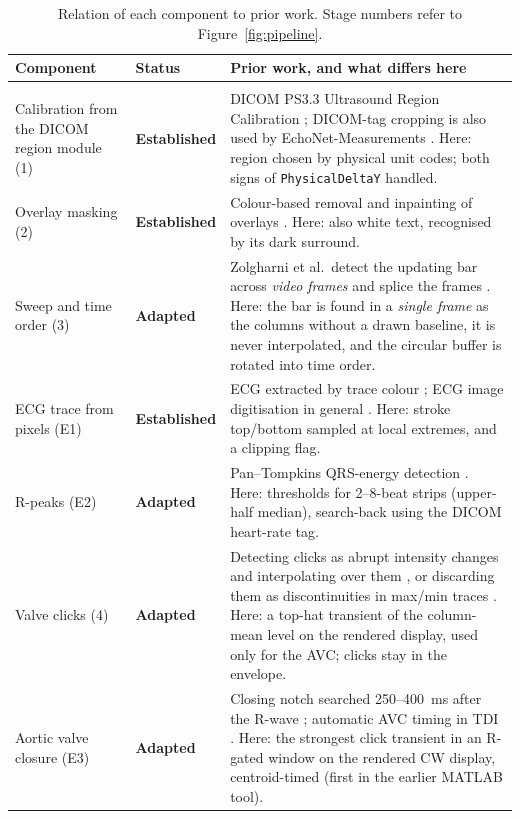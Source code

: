 \documentclass[10pt,a4paper]{article}
\newcommand{\code}[1]{\texttt{\small #1}}
\newcommand{\est}{\textcolor{gray!75!black}{\textbf{Established}}}
\newcommand{\adp}{\textcolor{orange!80!black}{\textbf{Adapted}}}
\begin{document}
\begin{table}[!htbp]
\centering\footnotesize
\caption{Relation of each component to prior work. Stage numbers refer to Figure~\ref{fig:pipeline}.}
\label{tab:novelty}
\setlength{\tabcolsep}{4pt}
\begin{tabularx}{\linewidth}{@{}>{\raggedright\arraybackslash}p{3.3cm}>{\raggedright\arraybackslash}p{1.9cm}L@{}}
\toprule
Component & Status & Prior work, and what differs here \\ \midrule
{} \\
Calibration from the DICOM region module (1) & \est & DICOM PS3.3 Ultrasound Region Calibration \cite{dicomus}; DICOM-tag cropping is also used by
EchoNet-Measurements \cite{echonetmeas}. Here: region chosen by physical unit codes; both signs of \code{PhysicalDeltaY} handled. \\
Overlay masking (2) & \est & Colour-based removal and inpainting of overlays \cite{uaguidance,zolgharni}. Here: also white text, recognised by its dark surround. \\
Sweep and time order (3) & \adp & Zolgharni et al.\ detect the updating bar across \emph{video frames} and splice the frames \cite{zolgharni}.
Here: the bar is found in a \emph{single frame} as the columns without a drawn baseline, it is never interpolated, and the circular buffer is rotated into time order. \\
ECG trace from pixels (E1) & \est & ECG extracted by trace colour \cite{zolgharni}; ECG image digitisation in general \cite{physionet2024}.
Here: stroke top/bottom sampled at local extremes, and a clipping flag. \\
R-peaks (E2) & \adp & Pan--Tompkins QRS-energy detection \cite{pantompkins}. Here: thresholds for 2--8-beat strips (upper-half median), search-back using the DICOM heart-rate tag. \\
Valve clicks (4) & \adp & Detecting clicks as abrupt intensity changes and interpolating over them \cite{patclickinterp}, or discarding them as discontinuities
in max/min traces \cite{patclickdiscard}. Here: a top-hat transient of the column-mean level on the rendered display, used only for the AVC; clicks stay in the envelope. \\
Aortic valve closure (E3) & \adp & Closing notch searched 250--400~ms after the R-wave \cite{patcardiacevents}; automatic AVC timing in TDI \cite{aase}.
Here: the strongest click transient in an R-gated window on the rendered CW display, centroid-timed (first in the earlier MATLAB tool). \\

\end{tabularx}
\end{table}
\end{document}
